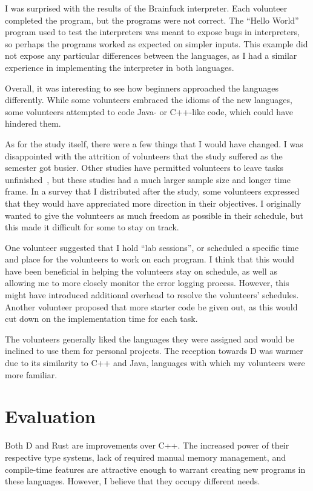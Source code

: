 \documentclass[finalcopy]{srpaper}
\begin{document}
I was surprised with the results of the Brainfuck interpreter. Each volunteer
completed the program, but the programs were not correct. The ``Hello World''
program used to test the interpreters was meant to expose bugs in
interpreters, so perhaps the programs worked as expected on simpler inputs.
This example did not expose any particular differences between the languages,
as I had a similar experience in implementing the interpreter in both
languages.

Overall, it was interesting to see how beginners approached the languages
differently. While some volunteers embraced the idioms of the new languages,
some volunteers attempted to code Java- or C++-like code, which could have
hindered them.

As for the study itself, there were a few things that I would have changed. I
was disappointed with the attrition of volunteers that the study suffered as
the semester got busier. Other studies have permitted volunteers to leave tasks
unfinished~\cite{Hoppe:2013:DBG:2509136.2509528}, but these studies had a much
larger sample size and longer time frame. In a survey that I distributed after
the study, some volunteers expressed that they would have appreciated more
direction in their objectives. I originally wanted to give the volunteers as
much freedom as possible in their schedule, but this made it difficult for some
to stay on track.

One volunteer suggested that I hold ``lab sessions'', or scheduled a specific
time and place for the volunteers to work on each program. I think that this
would have been beneficial in helping the volunteers stay on schedule, as well
as allowing me to more closely monitor the error logging process. However, this
might have introduced additional overhead to resolve the volunteers' schedules.
Another volunteer proposed that more starter code be given out, as this would
cut down on the implementation time for each task.

The volunteers generally liked the languages they were assigned and would be
inclined to use them for personal projects. The reception towards D was warmer
due to its similarity to C++ and Java, languages with which my volunteers were
more familiar.

\section{Evaluation}

Both D and Rust are improvements over C++. The increased power of their
respective type systems, lack of required manual memory management, and
compile-time features are attractive enough to warrant creating new programs
in these languages. However, I believe that they occupy different needs.
\end{document}
